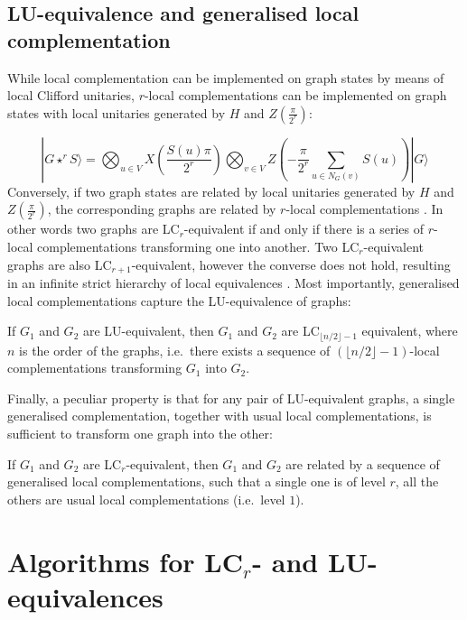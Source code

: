 \documentclass[a4paper,UKenglish,cleveref,autoref,thm-restate]{arxiv}
\newcommand{\ket}[1]{  |{#1} \rangle} %
\begin{document}
\subsection{LU-equivalence and generalised local complementation}
 
While local complementation can be implemented on graph states by means of local Clifford unitaries, $r$-local complementations can be implemented on graph states with local unitaries generated by $H$ and $Z\left(\frac \pi {2^r}\right)$:

$$\ket{G\star^r S} = \bigotimes_{u\in V}X\left(\frac {S(u)\pi}{2^r}\right)\bigotimes_{v\in V}Z\left(-\frac {\pi}{2^r}\sum_{u \in N_G(v)}S(u)\right)\ket{G}$$
Conversely, if two graph states are related by local unitaries generated by $H$ and $Z\left(\frac \pi {2^r}\right)$, the corresponding graphs are related by $r$-local complementations \cite{claudet2024local}. In other words two graphs are LC$_r$-equivalent if and only if there is a series of $r$-local complementations transforming one into another. Two LC$_r$-equivalent graphs are also LC$_{r+1}$-equivalent, however the converse does not hold, resulting in an infinite strict hierarchy of local equivalences \cite{claudet2024local}. 
Most importantly, generalised local complementations capture the LU-equivalence of graphs:

\begin{theorem}{\bf \cite{claudet2024local}}\label{thm:LU_imply_LCr}
    If $G_1$ and $G_2$ are LU-equivalent, then $G_1$ and $G_2$ are LC$_{\lfloor n/2 \rfloor-1}$ equivalent, where $n$ is the order of the graphs, i.e.~there exists a sequence of $({\lfloor n/2 \rfloor-1})$-local complementations transforming $G_1$ into $G_2$.
\end{theorem}

Finally, a peculiar property is that for any pair of LU-equivalent graphs, a single generalised complementation, together with usual local complementations, is sufficient to transform one graph into the other:

\begin{proposition}{\bf \cite{claudet2024local}} \label{prop:LCr_lc}
 If $G_1$ and $G_2$ are LC$_r$-equivalent, then $G_1$ and $G_2$ are related by a sequence of generalised local complementations, such that a single one is of level $r$, all the others are usual local complementations (i.e.~level $1$).

\end{proposition}


\section{Algorithms for LC$_r$- and LU-equivalences}
\end{document}
